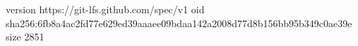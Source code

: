 version https://git-lfs.github.com/spec/v1
oid sha256:6fb8a4ac2fd77e629ed39aaaee09bdaa142a2008d77d8b156bb95b349c0ae39e
size 2851
